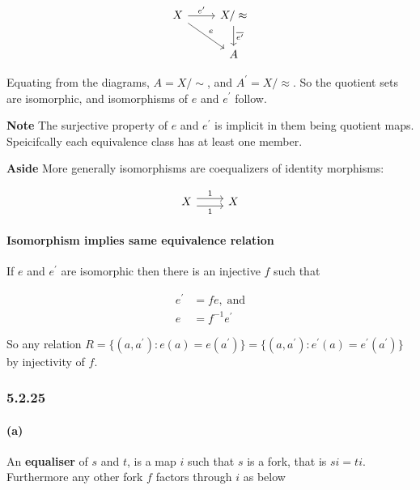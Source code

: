 \documentclass{article}
\begin{document}
\begin{equation*}
\begin{tikzcd}
X \arrow[rd,"e"] \arrow[r, "e^\prime"] & X/\approx \arrow[d, "\overline{e^\prime}"] \\
& A
\end{tikzcd}
\end{equation*}

Equating from the diagrams, $A=X/\sim$, and $A^\prime=X/\approx$. So the quotient sets are isomorphic, and isomorphisms of $e$ and $e^\prime$ follow.

\textbf{Note} The surjective property of $e$ and $e^\prime$ is implicit in them being quotient maps. Speicifcally each equivalence class has at least one member.

\textbf{Aside} More generally isomorphisms are coequalizers of identity morphisms:

\begin{equation*}
\label{eqn5143}
\begin{tikzcd}
  X \ar[r,shift left=.75ex,"1"]
    \ar[r,shift right=.75ex,swap,"1"] & X
\end{tikzcd}
\end{equation*}

\paragraph{Isomorphism implies same equivalence relation}

If $e$ and $e^\prime$ are isomorphic then there is an injective $f$ such that

\begin{align*}
  e^\prime &= f e, \;\text{and}\\
  e &= f^{-1}e^\prime
\end{align*}

So any relation $R = \{(a,a^\prime)\colon e(a) = e(a^\prime)\} = \{(a,a^\prime)\colon e^\prime(a) = e^\prime(a^\prime)\}$ by injectivity of $f$.

\subsubsection*{5.2.25}
\paragraph{(a)}

An \textbf{equaliser} of $s$ and $t$, is a map $i$ such that $s$ is a fork, that is $si=ti$. Furthermore any other fork $f$ factors through $i$ as below
\end{document}
